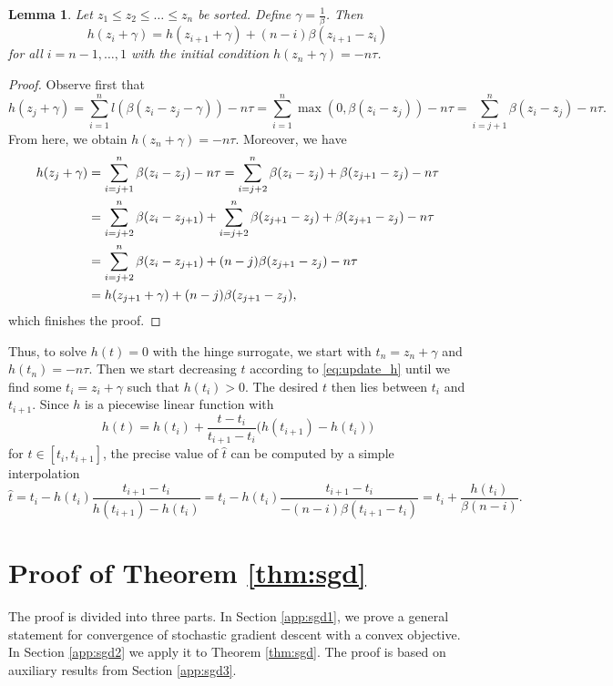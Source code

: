 \documentclass[]{interact}
\theoremstyle{plain}%
\newtheorem{lemma}[theorem]{Lemma}
\theoremstyle{definition}
\theoremstyle{remark}
\begin{document}
\begin{lemma}
Let $z_1\le z_2\le\dots\le z_n$ be sorted. Define $\gamma=\frac1\beta$. Then 
\begin{equation}\label{eq:update_h}
h(z_i+\gamma) = h(z_{i+1}+\gamma) + (n-i)\beta(z_{i+1}-z_i)
\end{equation}
for all $i=n-1,\dots,1$ with the initial condition $h(z_n+\gamma)=-n\tau$.
\end{lemma}
\begin{proof}
Observe first that
$$
h(z_j+\gamma) = \sum_{i=1}^n l(\beta(z_i-z_j-\gamma)) - n\tau = \sum_{i=1}^n\max(0,\beta(z_i-z_j)) - n\tau = \sum_{i=j+1}^n \beta(z_i-z_j) - n\tau.
$$
From here, we obtain $h(z_n+\gamma)=-n\tau$. Moreover, we have
$$
\aligned
h(z_j+\gamma) &= \sum_{i=j+1}^n \beta(z_i-z_j) - n\tau = \sum_{i=j+2}^n \beta(z_i-z_{j}) + \beta(z_{j+1}-z_{j})- n\tau\\
&= \sum_{i=j+2}^n \beta(z_i-z_{j+1}) + \sum_{i=j+2}^n\beta(z_{j+1}-z_j) + \beta(z_{j+1}-z_{j})- n\tau \\
&= \sum_{i=j+2}^n \beta(z_i-z_{j+1}) + (n-j)\beta(z_{j+1}-z_j)- n\tau \\
&= h(z_{j+1}+\gamma) + (n-j)\beta(z_{j+1}-z_j),
\endaligned
$$
which finishes the proof.
\end{proof}

Thus, to solve $h(t)=0$ with the hinge surrogate, we start with $t_n=z_n+\gamma$ and $h(t_n)=-n\tau$. Then we start decreasing $t$ according to \eqref{eq:update_h} until we find some $t_i=z_i+\gamma$ such that $h(t_i)>0$. The desired $t$ then lies between $t_i$ and $t_{i+1}$. Since $h$ is a piecewise linear function with
$$
h(t) = h(t_i) + \frac{t-t_i}{t_{i+1}-t_i}\big(h(t_{i+1})-h(t_i)\big)
$$
for $t\in [t_i,t_{i+1}]$, the precise value of $\hat t$ can be computed by a simple interpolation
$$
\hat t = t_i - h(t_i)\frac{t_{i+1}-t_i}{h(t_{i+1})-h(t_i)} = t_i - h(t_i)\frac{t_{i+1}-t_i}{-(n-i)\beta(t_{i+1}-t_{i})} = t_i + \frac{h(t_i)}{\beta(n-i)}.
$$



\section{Proof of Theorem \ref{thm:sgd}}

The proof is divided into three parts. In Section \ref{app:sgd1}, we prove a general statement for convergence of stochastic gradient descent with a convex objective. In Section \ref{app:sgd2} we apply it to Theorem \ref{thm:sgd}. The proof is based on auxiliary results from Section \ref{app:sgd3}.
\end{document}
